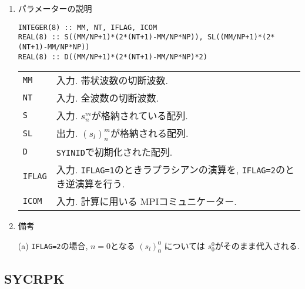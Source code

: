 \documentclass[a4j]{jsarticle}
\begin{document}
\begin{enumerate}
\item パラメーターの説明

\begin{verbatim}
INTEGER(8) :: MM, NT, IFLAG, ICOM
REAL(8) :: S((MM/NP+1)*(2*(NT+1)-MM/NP*NP)), SL((MM/NP+1)*(2*(NT+1)-MM/NP*NP))
REAL(8) :: D((MM/NP+1)*(2*(NT+1)-MM/NP*NP)*2)
\end{verbatim}

\begin{tabular}{ll}
\texttt{MM} & 入力. 帯状波数の切断波数.\\  
\texttt{NT} & 入力. 全波数の切断波数.\\
\texttt{S} & 入力. $s^m_n$が格納されている配列.\\
\texttt{SL} & 出力. $(s_l)^m_n$が格納される配列.\\
\texttt{D} & \texttt{SYINID}で初期化された配列.\\
\texttt{IFLAG} & 入力. \texttt{IFLAG=1}のときラプラシアンの演算を,
\texttt{IFLAG=2}のとき逆演算を行う.\\
\texttt{ICOM} & 入力. 計算に用いる MPIコミュニケーター.
\end{tabular}

\item 備考

(a) \texttt{IFLAG=2}の場合, $n=0$となる $(s_l)^0_0$ については
$s^0_0$がそのまま代入される.

\end{enumerate}


\subsection{SYCRPK}
\end{document}
